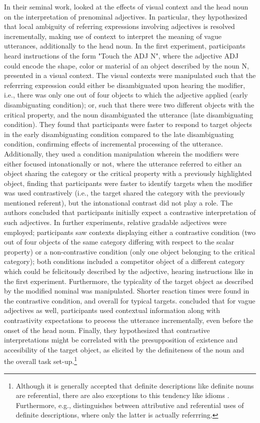 In their seminal work, \textcite{sedivy1999} looked at the effects of visual context and the head noun on the interpretation of prenominal adjectives. In particular, they hypothesized that local ambiguity of referring expressions involving adjectives is resolved incrementally, making use of context to interpret the meaning of vague utterances, additionally to the head noun. 
In the first experiment, participants heard instructions of the form "Touch the ADJ N", where the adjective ADJ could encode the shape, color or material of an object described by the noun N, presented in a visual context. The visual contexts were manipulated such that the referrring expression could either be disambiguated upon hearing the modifier, i.e., there was only one out of four objects to which the adjective applied (early disambiguating condition); or, such that there were two different objects with the critical property, and the noun disambiguated the utterance (late disambiguating condition). 
They found that participants were faster to respond to target objects in the early disambiguating condition compared to the late disambiguating condition, confirming effects of incremental processing of the utterance. 
 Additionally, they used a condition manipulation wherein the modifiers were either focused intonationally or not, where the utterance referred to either an object sharing the category or the critical property with a previously highlighted object, finding that participants were faster to identify targets when the modifier was used contrastively (i.e., the target shared the category with the previously mentioned referent), but the intonational contrast  did not play a role. The authors concluded that participants initially expect a contrastive interpretation of such adjectives. 
 In further experiments, relative gradable adjectives were employed; participants saw contexts displaying either a contrastive condition (two out of four objects of the same category differing with respect to the scalar property) or a non-contrastive condition (only one object belonging to the critical category); both conditions included a competitor object of a different category which could be felicitously described by the adjective, hearing instructions like in the first experiment. Furthermore, the typicality of the target object as described by the modified nominal was manipulated. Shorter reaction times were found in the contrastive condition, and overall for typical targets. \textcite{sedivy1999} concluded that for vague adjectives as well, participants used contextual information along with contrastivity expectations to process the utterance incrementally, even before the onset of the head noun. Finally, they hypothesized that contrastive interpretations might be correlated with the presupposition of existence and accesibility of the target object, as elicited by the definiteness of the noun and the overall task set-up.\footnote{Although it is generally accepted that definite descriptions like definite nouns are referential, there are also exceptions to this tendency like idioms \parencite{Reboul2001}. Furthermore, e.g., \textcite{donnellan1966reference} distinguishes between attributive and referential uses of definite descriptions, where only the latter is actually referrring.} 
